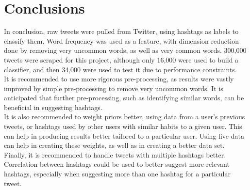 \documentclass[conference]{IEEEtran}
\begin{document}

\section{Conclusions}
In conclusion, raw tweets were pulled from Twitter, using hashtags as labels to classify them. Word frequency was used as a feature, with dimension reduction done by removing very uncommon words, as well as very common words. 300,000 tweets were scraped for this project, although only 16,000 were used to build a classifier, and then 34,000 were used to test it due to performance constraints. \\

It is recommended to use more rigorous pre-processing, as results were vastly improved by simple pre-processing to remove very uncommon words. It is anticipated that further pre-processing, such as identifying similar words, can be beneficial in suggesting hashtags. \\

It is also recommended to weight priors better, using data from a user's previous tweets, or hashtags used by other users with similar habits to a given user. This can help in producing results better tailored to a particular user. Using live data can help in creating these weights, as well as in creating a better data set. \\

Finally, it is recommended to handle tweets with multiple hashtags better. Correlation between hashtags could be used to better suggest more relevant hashtags, especially when suggesting more than one hashtag for a particular tweet.





\end{document}
